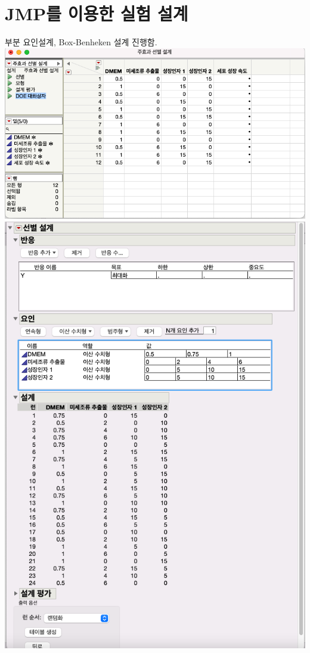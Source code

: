 \documentclass{article}
\begin{document}
    \section{JMP를 이용한 실험 설계}
    부분 요인설계, Box-Benheken 설계 진행함.\\
    \includegraphics[scale=0.5]{jmp2level.png}\\
    \includegraphics[scale=0.5]{jmpdescretic.png}\\
\end{document}
